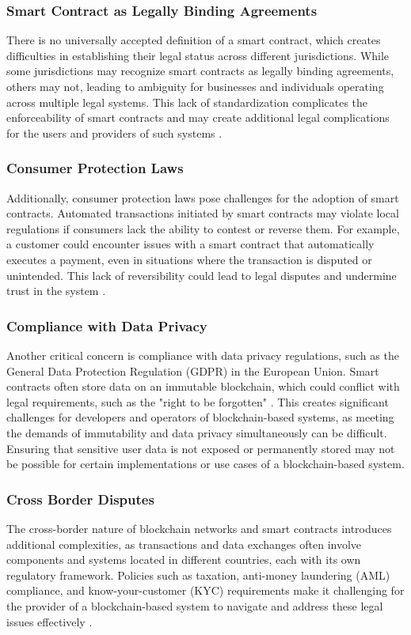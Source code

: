\subsubsection{Smart Contract as Legally Binding Agreements}
There is no universally accepted definition of a smart contract, which creates difficulties in establishing their legal status across different jurisdictions. While some jurisdictions may recognize smart contracts as legally binding agreements, others may not, leading to ambiguity for businesses and individuals operating across multiple legal systems. This lack of standardization complicates the enforceability of smart contracts and may create additional legal complications for the users and providers of such systems \autocite{Mik2017Smart}.

\subsubsection{Consumer Protection Laws}
Additionally, consumer protection laws pose challenges for the adoption of smart contracts. Automated transactions initiated by smart contracts may violate local regulations if consumers lack the ability to contest or reverse them. For example, a customer could encounter issues with a smart contract that automatically executes a payment, even in situations where the transaction is disputed or unintended. This lack of reversibility could lead to legal disputes and undermine trust in the system \autocite{ferreira2021regulating}.

\subsubsection{Compliance with Data Privacy}
Another critical concern is compliance with data privacy regulations, such as the General Data Protection Regulation (GDPR) in the European Union. Smart contracts often store data on an immutable blockchain, which could conflict with legal requirements, such as the "right to be forgotten" \autocite{mantelero2013eu}. This creates significant challenges for developers and operators of blockchain-based systems, as meeting the demands of immutability and data privacy simultaneously can be difficult. Ensuring that sensitive user data is not exposed or permanently stored may not be possible for certain implementations or use cases of a blockchain-based system.

\subsubsection{Cross Border Disputes}
The cross-border nature of blockchain networks and smart contracts introduces additional complexities, as transactions and data exchanges often involve components and systems located in different countries, each with its own regulatory framework. Policies such as taxation, anti-money laundering (AML) compliance, and know-your-customer (KYC) requirements make it challenging for the provider of a blockchain-based system to navigate and address these legal issues effectively \autocites{Spafford2019Blockchain}{Li2023Cross-Border}.

